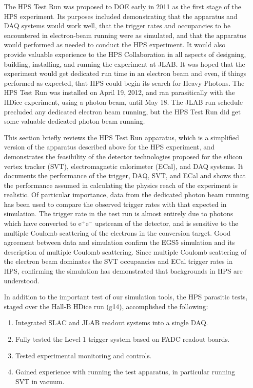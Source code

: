The HPS Test Run was proposed to DOE early in 2011 as the first stage of the HPS experiment. Its
purposes included demonstrating that the apparatus and DAQ systems would work well,
that the trigger rates and occupancies to be encountered in electron-beam running were as simulated,
and that the apparatus would performed as needed to conduct the HPS experiment. It would also
provide valuable experience to the HPS Collaboration in all aspects of designing, building, installing,
and running the experiment at JLAB. It was hoped that the experiment would get dedicated run time
in an electron beam and even, if things performed as expected, that HPS could begin its search for
Heavy Photons. The HPS Test Run was installed on April 19, 2012, and ran parasitically with the HDice
experiment, using a photon beam, until May 18. The JLAB run schedule precluded any dedicated
electron beam running, but the HPS Test Run did get some valuable dedicated photon beam running.

This section briefly reviews the HPS Test Run apparatus, which is a simplified version of the apparatus
described above for the HPS experiment, and demonstrates the feasibility of the detector
technologies proposed for the silicon vertex tracker (SVT), electromagnetic calorimeter (ECal), 
and DAQ systems. It documents the
performance of the trigger, DAQ, SVT, and ECal 
and shows that the performance assumed in calculating the physics reach of the experiment is realistic.
Of particular importance, data from the dedicated photon beam running has been used to compare
the observed trigger rates with that expected in simulation. The trigger rate in the test run is almost 
entirely due to photons which have converted to e$^+$e$^-$ upstream of the detector, 
and is sensitive to the multiple
Coulomb scattering of the electrons in the conversion target. Good agreement between data and
simulation confirm the EGS5 simulation and its description of multiple Coulomb scattering. Since
multiple Coulomb scattering of the electron beam dominates the SVT occupancies and ECal trigger rates
in HPS, confirming the simulation has demonstrated that backgrounds in HPS are understood.

In addition to the important test of our simulation tools, the HPS parasitic tests, staged over the Hall-B HDice run (g14), accomplished the following: 
\begin{enumerate}
\item Integrated SLAC and JLAB readout systems into a single DAQ.
\item Fully tested the Level 1 trigger system based on FADC readout boards.
\item Tested experimental monitoring and controls.
\item Gained experience with running the test apparatus, in particular running SVT in vacuum.
\end{enumerate}

